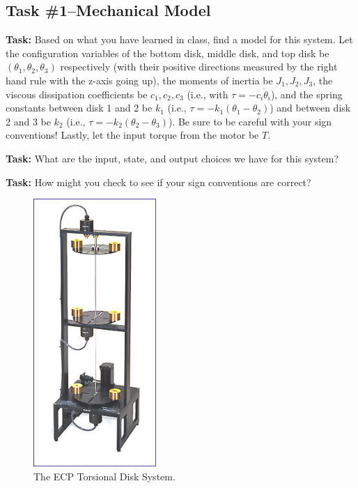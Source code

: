 \subsection{Task \#1--Mechanical Model}

\noindent \textbf{Task:} Based on what you have learned in class, find 
a model for this system.  Let the configuration variables of the bottom disk,
middle disk, and top disk be $(\theta_1,\theta_2,\theta_3)$ respectively (with their positive
directions measured by the right hand rule with the z-axis going up), the
moments of inertia be $J_1,J_2,J_3$, the viscous dissipation coefficients be
$c_1,c_2,c_3$ (i.e., with $\tau=-c_i \dot{\theta}_i$), and the spring constants between
disk 1 and 2 be $k_1$ (i.e., $\tau=-k_1(\theta_1-\theta_2)$) and between disk 2 and 3 be
$k_2$ (i.e., $\tau=-k_2(\theta_2-\theta_3)$).  Be sure to be careful with your sign
conventions!  Lastly, let the input torque from the motor be $T$.

\noindent \textbf{Task:}  What are the input, state, and output choices we have for this system?

\noindent \textbf{Task:}  How might you check to see if your sign conventions
are correct?

\begin{figure}
\begin{center}
\vspace{-.1in}
\includegraphics[height=4in]{Lab2/model205}
\end{center}
\vspace{-.15in}
\caption{The ECP Torsional Disk System.}
\label{fig-ecp}
\end{figure}


